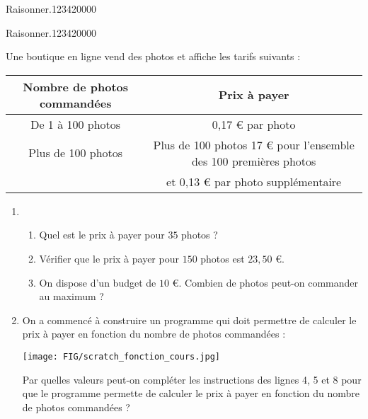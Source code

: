 \begin{pageAuto} 


\begin{ExoAuto}{Raisonner.}{1234}{2}{0}{0}{0}{0}

  

\end{ExoAuto}



 
\begin{ExoAuto}{Raisonner.}{1234}{2}{0}{0}{0}{0}

 Une boutique en ligne vend des photos et affiche les tarifs suivants :

 \begin{tabular}{|c|c|}
 \hline 
 Nombre de photos commandées & Prix à payer \\ 
 \hline 
De 1 à 100 photos & 0,17 \euro{} par photo \\ 
 \hline 
Plus de 100 photos & Plus de 100 photos 17 \euro{} pour l’ensemble des 100 premières photos
\\  
  & et 0,13 \euro{} par photo supplémentaire  \\ 
 \hline 
 \end{tabular} 

\begin{enumerate}
\item 

\begin{enumerate}
\item Quel est le prix à payer pour $35$ photos ?
\item  Vérifier que le prix à payer pour $150$ photos est $23,50$ \euro{}. 
\item  On dispose d'un budget de $10$ \euro{}. Combien de photos peut-on commander au maximum ? 
\end{enumerate}

\item  On a commencé à construire un programme qui doit permettre de calculer le prix à payer en
fonction du nombre de photos commandées :

\texttt{[image: FIG/scratch\_fonction\_cours.jpg]} 

Par quelles valeurs peut-on compléter les instructions des lignes 4, 5 et 8 pour que
le programme permette de calculer le prix à payer en fonction du nombre de photos
commandées ?


\end{enumerate}
\end{ExoAuto}
\end{pageAuto}

